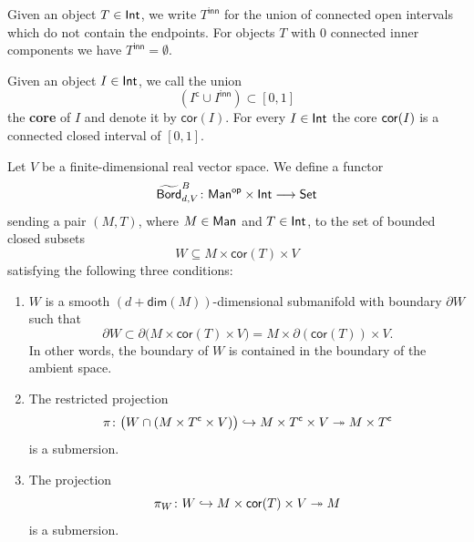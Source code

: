 \begin{notation}
Given an object $T\in \operatorname{\mathsf{Int}}$, we write $T^{\mathsf{inn}}$ for the union of connected open intervals which do not contain the endpoints. For objects $T$ with $0$ connected inner components we have $T^{\mathsf{inn}} = \emptyset$. 
\end{notation}

\begin{notation}
Given an object $I \in \operatorname{\mathsf{Int}}$, we call the union
\[
(I^{\mathsf{c}}\cup I^{\mathsf{inn}}) \subset [0,1]
\]
the \textbf{core} of $I$ and denote it by $\mathsf{cor}(I)$. For every $I\in \operatorname{\mathsf{Int}}$ the core $\operatorname{{\sf cor}}(I)$ is a connected closed interval of $[0,1]$.
\end{notation}

\begin{definition}\label{ch3:: def: bord_d}
    Let $V$ be a finite-dimensional real vector space. We define a functor 
    \begin{equation}
    \widetilde{\operatorname{\mathsf{Bord}}}^{B}_{d,V} \colon \mathsf{Man}^{\mathsf{op}}\times \operatorname{\mathsf{Int}} \longrightarrow \operatorname{{\mathsf{Set}}}    
    \end{equation}
    sending a pair $(M,T)$, where $M\in \operatorname{\sf Man}$ and $T\in \operatorname{\mathsf{Int}}$, to the set of bounded closed subsets 
    \begin{equation}
    W\subseteq M\times \mathsf{cor}(T) \times V
    \end{equation} 
    satisfying the following three conditions:
    \begin{enumerate}
    \item \label{id: dim} $W$ is a smooth $(d+\mathsf{dim}(M))$-dimensional submanifold with boundary $\partial W$ such that 
    \begin{equation}
        \partial W \subset \partial \big(M \times \mathsf{cor}(T) \times V\big) = M \times \partial (\mathsf{cor}(T)) \times V.   
    \end{equation}
    In other words, the boundary of $W$ is contained in the boundary of the ambient space.
    \item \label{id: categorical} The restricted projection 
    \begin{equation}
        \pi\colon \big(W \cap (M\times T^{\mathsf c} \times V) \big) \hookrightarrow  M \times T^{\mathsf c} \times V \twoheadrightarrow  M \times T^{\mathsf c}
    \end{equation} 
    is a submersion. 
    \item \label{id: spatial} The projection 
    \begin{equation}
    \pi_W\colon W \hookrightarrow M\times \mathsf{cor}(T) \times V \twoheadrightarrow M 
    \end{equation}
    is a submersion.
    \end{enumerate} 


\end{definition}
